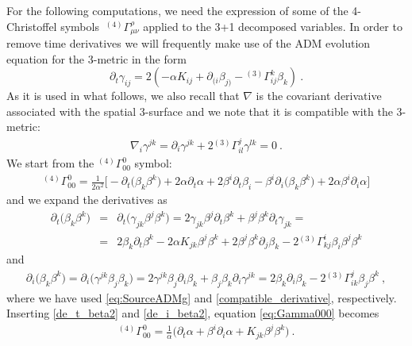 \documentclass{article}
\begin{document}
For the following computations, we need the expression of some of the 4-Christoffel symbols
$\ {}^{(4)}\Gamma^\rho_{\mu\nu}$ applied to the 3+1 decomposed
variables. In order to remove time derivatives we will frequently make
use of the ADM evolution equation for the 3-metric in the form
%
\begin{equation}
  \label{eq:SourceADMg}
  \partial_t \gamma_{ij} = 2\left(- \alpha K_{ij} + \partial_{(i}
  \beta_{j)} - {}^{(3)}\Gamma^k_{ij} \beta_k \right)\ .
\end{equation}
%
As it is used in what follows, we also recall that $\nabla$ is the
covariant derivative associated with the spatial 3-surface and we note that it is
compatible with the 3-metric:
%
\begin{eqnarray}
\label{compatible_derivative}
\nabla_i\gamma^{jk}=\partial_i\gamma^{jk} + 2{}^{(3)}\Gamma^j_{il}\gamma^{lk} = 0 \ .
\end{eqnarray}
%
We start from the ${}^{(4)}\Gamma^0_{00}$ symbol:
%
\begin{eqnarray}
\label{eq:Gamma000}
{}^{(4)}\Gamma^0_{00} = \frac{1}{2\alpha^2}\Big[
-\partial_t\big(\beta_k\beta^k\big)+2\alpha\partial_t\alpha
+ 2\beta^i\partial_t\beta_i - \beta^i\partial_i\big(\beta_k\beta^k\big) + 2\alpha\beta^i\partial_i\alpha\Big]
\end{eqnarray}
%
and we expand the derivatives as
%
\begin{eqnarray} \label{de_t_beta2}
\partial_t\big(\beta_k\beta^k\big) &=&
\partial_t\big(\gamma_{jk}\beta^j\beta^k\big) = 2\gamma_{jk}\beta^j\partial_t\beta^k +
\beta^j\beta^k\partial_t\gamma_{jk} = \nonumber \\
 &=& 2\beta_k\partial_t\beta^k -2\alpha K_{jk}
\beta^j\beta^k + 2\beta^j\beta^k\partial_j\beta_k - 2{}^{(3)}\Gamma^i_{kj} \beta_i\beta^j\beta^k
\end{eqnarray}
%
and
%
\begin{eqnarray}  \label{de_i_beta2}
\partial_i\big(\beta_k\beta^k\big) =
\partial_i\big(\gamma^{jk}\beta_j\beta_k\big) =
2\gamma^{jk}\beta_j\partial_i\beta_k + \beta_j\beta_k\partial_i\gamma^{jk} =
2\beta_k\partial_i\beta_k -2{}^{(3)}\Gamma^j_{ik}\beta_j\beta^k \ ,
\end{eqnarray}
%
where we have used \eqref{eq:SourceADMg} and
\eqref{compatible_derivative}, respectively.
Inserting \eqref{de_t_beta2} and \eqref{de_i_beta2}, equation
\eqref{eq:Gamma000} becomes
%
\begin{eqnarray}
  \label{eq:Gamma000_final}
{}^{(4)}\Gamma^0_{00} = \frac{1}{\alpha}\Big(\partial_t\alpha +
\beta^i\partial_i\alpha + K_{jk}\beta^j\beta^k \Big)\ .
\end{eqnarray}
\end{document}
